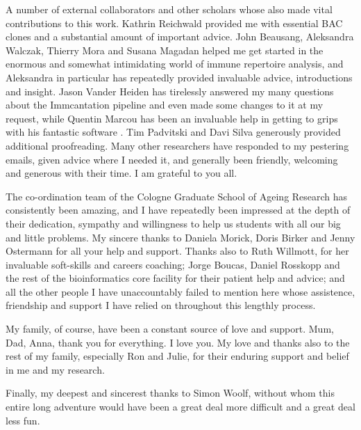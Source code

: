 {A number of external collaborators and other scholars whose also made vital contributions to this work. Kathrin Reichwald provided me with essential BAC clones and a substantial amount of important advice. John Beausang, Aleksandra Walczak, Thierry Mora and Susana Magadan helped me get started in the enormous and somewhat intimidating world of immune repertoire analysis, and Aleksandra in particular has repeatedly provided invaluable advice, introductions and insight. Jason Vander Heiden has tirelessly answered my many questions about the Immcantation pipeline and even made some changes to it at my request, while Quentin Marcou has been an invaluable help in getting to grips with his fantastic software . Tim Padvitski and Davi Silva generously provided additional proofreading. Many other researchers have responded to my pestering emails, given advice where I needed it, and generally been friendly, welcoming and generous with their time. I am grateful to you all.

The co-ordination team of the Cologne Graduate School of Ageing Research has consistently been amazing, and I have repeatedly been impressed at the depth of their dedication, sympathy and willingness to help us students with all our big and little problems. My sincere thanks to Daniela Morick, Doris Birker and Jenny Ostermann for all your help and support. Thanks also to Ruth Willmott, for her invaluable soft-skills and careers coaching; Jorge Boucas, Daniel Rosskopp and the rest of the bioinformatics core facility for their patient help and advice; and all the other people I have unaccountably failed to mention here whose assistence, friendship and support I have relied on throughout this lengthly process.

My family, of course, have been a constant source of love and support. Mum, Dad, Anna, thank you for everything. I love you. My love and thanks also to the rest of my family, especially Ron and Julie, for their enduring support and belief in me and my research. 

Finally, my deepest and sincerest thanks to Simon Woolf, without whom this entire long adventure would have been a great deal more difficult and a great deal less fun.
}
